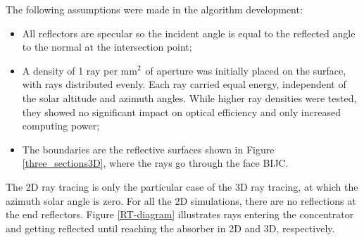 \doublespacing




The following assumptions were made in the algorithm development:

\begin{itemize} [topsep=5pt,partopsep=0pt] \itemsep0pt
\item All reflectors are specular so the incident angle is equal to the reflected angle to the normal at the intersection point;
\item A density of 1 ray per mm$^{\rm 2}$ of aperture was initially placed on the surface, with rays distributed evenly. Each ray carried equal energy, independent of the solar altitude and azimuth angles. While higher ray densities were tested, they showed no significant impact on optical efficiency and only increased computing power;
\item The boundaries are the reflective surfaces shown in Figure \ref{three_sections3D}, where the rays go through the face BIJC.
\end{itemize}

The 2D ray tracing is only the particular case of the 3D ray tracing, at which the azimuth solar angle is zero. For all the 2D simulations, there are no reflections at the end reflectors. Figure \ref{RT-diagram} illustrates rays entering the concentrator and getting reflected until reaching the absorber in 2D and 3D, respectively.

